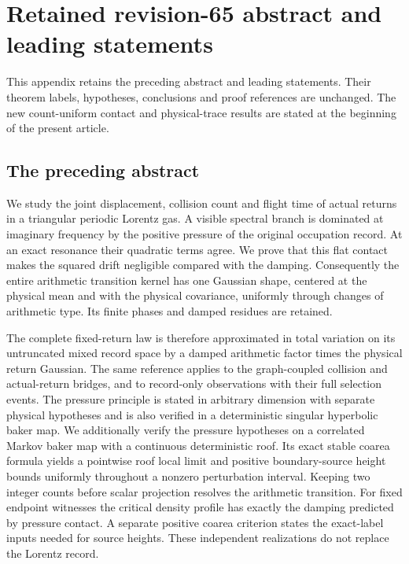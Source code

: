 \section{Retained revision-65 abstract and leading statements}
\label{app:v66-retained-front}
This appendix retains the preceding abstract and leading statements.
Their theorem labels, hypotheses, conclusions and proof references are
unchanged. The new count-uniform contact and physical-trace results are
stated at the beginning of the present article.
\subsection*{The preceding abstract}

We study the joint displacement, collision count and flight time of
actual returns in a triangular periodic Lorentz gas. A visible spectral
branch is dominated at imaginary frequency by the positive pressure
of the original occupation record. At an exact resonance their
quadratic terms agree. We prove that this flat contact makes the
squared drift negligible compared with the damping. Consequently the
entire arithmetic transition kernel has one Gaussian shape, centered
at the physical mean and with the physical covariance, uniformly
through changes of arithmetic type. Its finite phases and damped
residues are retained.

The complete fixed-return law is therefore approximated in total
variation on its untruncated mixed record space by a damped arithmetic
factor times the physical return Gaussian. The same reference applies
to the graph-coupled collision and actual-return bridges, and to
record-only observations with their full selection events. The pressure
principle is stated in arbitrary dimension with separate physical
hypotheses and is also verified in a deterministic singular hyperbolic
baker map. We additionally verify the pressure hypotheses on a
correlated Markov baker map with a continuous deterministic roof. Its
exact stable coarea formula yields a pointwise roof local limit and
positive boundary-source height bounds uniformly throughout a nonzero
perturbation interval. Keeping two integer counts before scalar projection
resolves the arithmetic transition. For fixed endpoint witnesses the
critical density profile has exactly the damping predicted by pressure
contact. A separate positive coarea criterion states the exact-label
inputs needed for source heights. These independent realizations
do not replace the Lorentz record.

